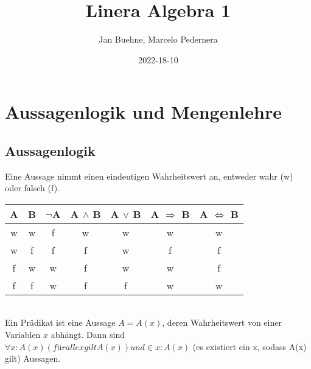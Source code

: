 \documentclass{article}
\title{Linera Algebra 1}
\date{2022-18-10}
\author{Jan Buehne, Marcelo Pedernera}
\begin{document}
    \maketitle
    \newpage

    \tableofcontents

    \section{Aussagenlogik und Mengenlehre}
    
    \subsection{Aussagenlogik}
    Eine Aussage nimmt einen eindeutigen Wahrheitswert an, entweder wahr (w) oder falsch (f). \\

    \begin{tabular}{ |c|c|c|c|c|c|c| }
        \hline
        A & B & $\lnot$A & A $\land$ B & A $\lor$ B & A $\Rightarrow$ B & A $\Leftrightarrow$ B \\
        \hline
        w & w & f & w & w & w & w \\
        w & f & f & f & w & f & f \\
        f & w & w & f & w & w & f \\
        f & f & w & f & f & w & w \\
        \hline


    \end{tabular} \\

    Ein Prädikat ist eine Aussage \( A = A(x) \), deren Wahrheitswert von einer Variablen $x$ abhängt.
    Dann sind $\forall x : A(x) (für alle x gilt A(x)) und \in x : A(x)$ (es existiert ein x, sodass A(x) gilt) Aussagen.
\end{document}
